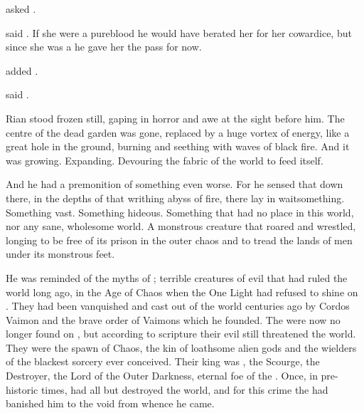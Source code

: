  asked \Ganethed.


 said \Teshrial. 
If she were a pureblood he would have berated her for her cowardice, but since she was a \bezed he gave her the pass for now. 

 added \Ganethed. 

 said \Teshrial.



\begin{comment}
  \subsection{Rian sees Resphain}
\end{comment}
Rian stood frozen still, gaping in horror and awe at the sight before him. 
The centre of the dead garden was gone, replaced by a huge vortex of energy, like a great hole in the ground, burning and seething with waves of black fire. 
And it was growing. 
Expanding. 
Devouring the fabric of the world to feed itself.

And he had a premonition of something even worse.
For he sensed that down there, in the depths of that writhing abyss of fire, there lay in wait\prikker something. 
Something vast. 
Something hideous. 
Something that had no place in this world, nor any sane, wholesome world. 
A monstrous creature that roared and wrestled, longing to be free of its prison in the outer chaos and to tread the lands of men under its monstrous feet. 


He was reminded of the myths of \dragons; terrible creatures of evil that had ruled the world long ago, in the Age of Chaos when the One Light had refused to shine on \Miith. 
They had been vanquished and cast out of the world centuries ago by Cordos Vaimon and the brave order of Vaimons which he founded. 
The \dragons were now no longer found on \Miith, but according to scripture their evil still threatened the world. 
They were the spawn of Chaos, the kin of loathsome alien gods and the wielders of the blackest sorcery ever conceived. 
Their king was \Isphet, the Scourge, the Destroyer, the Lord of the Outer Darkness, eternal foe of the \sephiroth. 
Once, in pre-historic times, \Isphet had all but destroyed the world, and for this crime the \sephiroth had banished him to the void from whence he came. 

